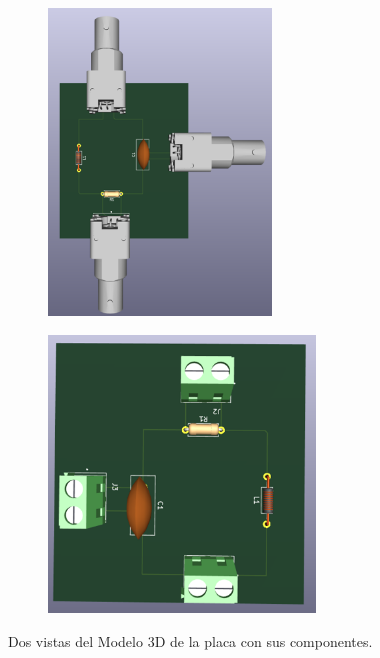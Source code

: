 \begin{figure}[!ht]
	\begin{minipage}[c]{0.5\textwidth}
		\begin{subfigure}{\textwidth}
			\centering
			\includegraphics[width=0.65198\textwidth,angle=90,origin=c]{Figures/26_05_2025/PCB_prototipo_BNC}
			\captionsetup{width=0.8\textwidth}
			\subcaption{}
		\end{subfigure}
	\end{minipage}\begin{minipage}[c]{0.49\textwidth}
		\begin{subfigure}{\textwidth}
			\centering
			\includegraphics[width=0.78\textwidth]{Figures/26_05_2025/PCB_prototipo_Borneras}
			\captionsetup{width=0.8\textwidth}
			\subcaption{}
		\end{subfigure}
	\end{minipage}
	\caption{Dos vistas del Modelo 3D de la placa con sus componentes.}
	\label{fig:}
\end{figure}


